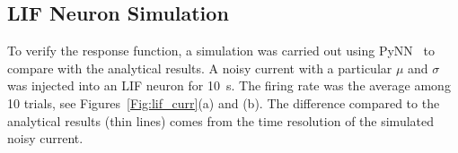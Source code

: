 %	
	
	
	
	
	\subsection{LIF Neuron Simulation}
	To verify the response function, a simulation was carried out using PyNN~\cite{davison2008pynn} to compare with the analytical results.
	A noisy current with a particular $\mu$ and $\sigma$ was injected into an LIF neuron for 10~s.
	The firing rate was the average among 10 trials, see Figures~\ref{Fig:lif_curr}(a) and (b).
	The difference compared to the analytical results (thin lines) comes from the time resolution of the simulated noisy current.
	
